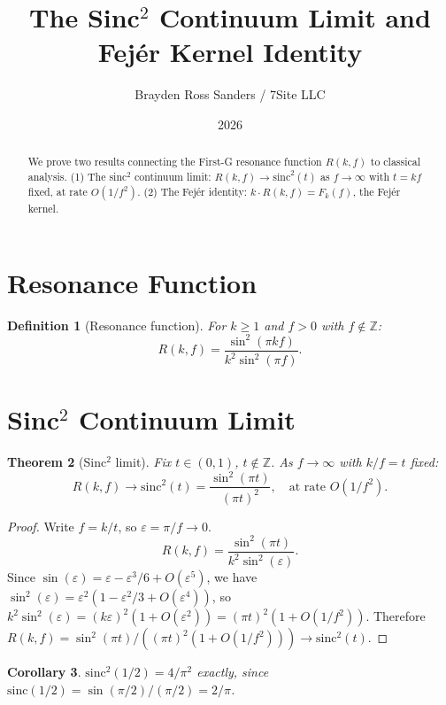 \documentclass{amsart}
\title{The Sinc$^2$ Continuum Limit and Fej\'er Kernel Identity}
\author{Brayden Ross Sanders / 7Site LLC}
\date{2026}
\newtheorem{theorem}{Theorem}
\newtheorem{corollary}[theorem]{Corollary}
\newtheorem{definition}[theorem]{Definition}
\begin{document}
\maketitle

\begin{abstract}
We prove two results connecting the First-G resonance function $R(k,f)$ to
classical analysis. (1) The sinc$^2$ continuum limit: $R(k,f) \to \mathrm{sinc}^2(t)$
as $f \to \infty$ with $t = kf$ fixed, at rate $O(1/f^2)$.
(2) The Fej\'er identity: $k \cdot R(k,f) = F_k(f)$, the Fej\'er kernel.
\end{abstract}

\section{Resonance Function}

\begin{definition}[Resonance function]
For $k \geq 1$ and $f > 0$ with $f \notin \mathbb{Z}$:
\[
  R(k,f) = \frac{\sin^2(\pi k f)}{k^2 \sin^2(\pi f)}.
\]
\end{definition}

\section{Sinc$^2$ Continuum Limit}

\begin{theorem}[Sinc$^2$ limit]
Fix $t \in (0,1)$, $t \notin \mathbb{Z}$. As $f \to \infty$ with $k/f = t$ fixed:
\[
  R(k,f) \longrightarrow \mathrm{sinc}^2(t) = \frac{\sin^2(\pi t)}{(\pi t)^2},
  \quad \text{at rate } O(1/f^2).
\]
\end{theorem}

\begin{proof}
Write $f = k/t$, so $\varepsilon = \pi/f \to 0$.
\[
  R(k,f) = \frac{\sin^2(\pi t)}{k^2 \sin^2(\varepsilon)}.
\]
Since $\sin(\varepsilon) = \varepsilon - \varepsilon^3/6 + O(\varepsilon^5)$,
we have $\sin^2(\varepsilon) = \varepsilon^2(1 - \varepsilon^2/3 + O(\varepsilon^4))$,
so $k^2 \sin^2(\varepsilon) = (k\varepsilon)^2(1+O(\varepsilon^2)) = (\pi t)^2(1+O(1/f^2))$.
Therefore $R(k,f) = \sin^2(\pi t)/((\pi t)^2(1+O(1/f^2))) \to \mathrm{sinc}^2(t)$.
\end{proof}

\begin{corollary}
$\mathrm{sinc}^2(1/2) = 4/\pi^2$ exactly, since $\mathrm{sinc}(1/2) = \sin(\pi/2)/(\pi/2) = 2/\pi$.
\end{corollary}
\end{document}
